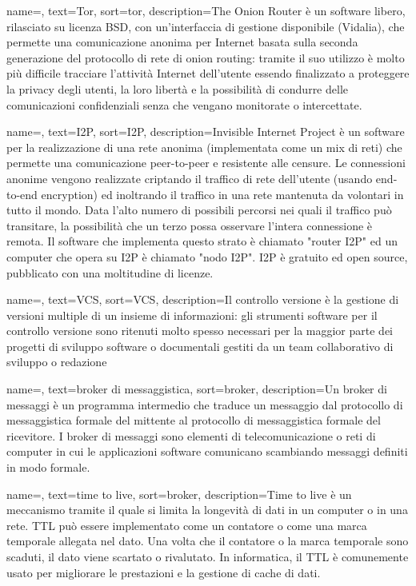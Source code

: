 \renewcommand{\glossaryname}{Glossario}

{
    name=,
    text=Tor,
    sort=tor,
    description={The Onion Router è un software libero, rilasciato su licenza BSD, con un'interfaccia di gestione disponibile (Vidalia), che permette una comunicazione anonima per Internet basata sulla seconda generazione del protocollo di rete di onion routing: tramite il suo utilizzo è molto più difficile tracciare l'attività Internet dell'utente essendo finalizzato a proteggere la privacy degli utenti, la loro libertà e la possibilità di condurre delle comunicazioni confidenziali senza che vengano monitorate o intercettate.}
}

{
    name=,
    text=I2P,
    sort=I2P,
    description={Invisible Internet Project è un software per la realizzazione di una rete anonima (implementata come un mix di reti) che permette una comunicazione peer-to-peer e resistente alle censure. Le connessioni anonime vengono realizzate criptando il traffico di rete dell'utente (usando end-to-end encryption) ed inoltrando il traffico in una rete mantenuta da volontari in tutto il mondo. Data l'alto numero di possibili percorsi nei quali il traffico può transitare, la possibilità che un terzo possa osservare l'intera connessione è remota. Il software che implementa questo strato è chiamato "router I2P" ed un computer che opera su I2P è chiamato "nodo I2P". I2P è gratuito ed open source, pubblicato con una moltitudine di licenze.}
}

{
    name=,
    text=VCS,
    sort=VCS,
    description={Il controllo versione è la gestione di versioni multiple di un insieme di informazioni: gli strumenti software per il controllo versione sono ritenuti molto spesso necessari per la maggior parte dei progetti di sviluppo software o documentali gestiti da un team collaborativo di sviluppo o redazione}
}

{
    name=,
    text=broker di messaggistica,
    sort=broker,
    description={Un broker di messaggi è un programma intermedio
che traduce un messaggio dal protocollo di messaggistica formale del mittente al
protocollo di messaggistica formale del ricevitore. I broker di messaggi sono elementi
di telecomunicazione o reti di computer in cui le applicazioni software comunicano
scambiando messaggi definiti in modo formale.}
}

{
    name=,
    text=time to live,
    sort=broker,
    description={Time to live è un meccanismo tramite il quale si limita la longevità di dati in un computer o in una rete. TTL può essere implementato come un contatore o come una marca temporale allegata nel dato. Una volta che il contatore o la marca temporale sono scaduti, il dato viene scartato o rivalutato. In informatica, il TTL è comunemente usato per migliorare le prestazioni e la gestione di cache di dati.}
}


